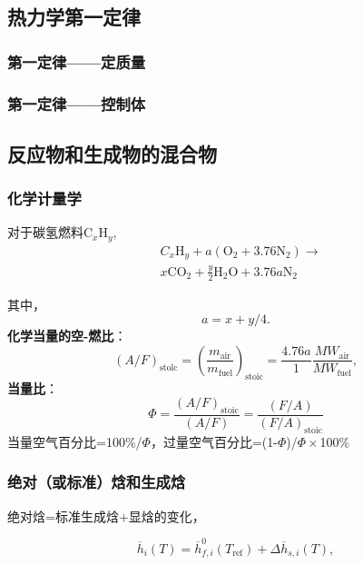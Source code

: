 \subsection{热力学第一定律}
\subsubsection{第一定律——定质量}
\subsubsection{第一定律——控制体}

\subsection{反应物和生成物的混合物}
\subsubsection{化学计量学}
对于碳氢燃料C$_x$H$_y$,
\begin{equation}
    \begin{aligned}
        &C_x\mathrm{H}_y + a(\mathrm{O}_2 + 3.76\mathrm{N}_2)\rightarrow\\
        & x\mathrm{CO}_2 + \frac{y}{2}\mathrm{H}_2\mathrm{O} + 3.76a\mathrm{N}_2
    \end{aligned}
\end{equation}



其中，
$$
a=x+y/4.
$$
\textbf{化学当量的空-燃比}：
\begin{equation}
    (A/F)_{\mathrm{stolc}}=\left(\frac{m_{\mathrm{air}}}{m_{\mathrm{fuel}}}\right)_{\mathrm{stoic}}=\frac{4.76a}{1}\frac{M W_{\mathrm{air}}}{MW_{\mathrm{fuel}}},
\end{equation}
\textbf{当量比}：
\begin{equation}
    \Phi={\frac{(A/F)_{\mathrm{stoic}}}{(A/F)}}={\frac{(F/A)}{(F/A)_{\mathrm{stoic}}}}
\end{equation}
当量空气百分比=100\%/$\Phi$，过量空气百分比=(1-$\Phi$)/$\Phi\times$100\%

\subsubsection{绝对（或标准）焓和生成焓}

绝对焓=标准生成焓+显焓的变化，

\begin{equation}
    \overline{h}_i(T) = \overline{h}_{f,i}^0(T_\mathrm{ref})+\Delta\overline{h}_{s,i}(T),
\end{equation}

